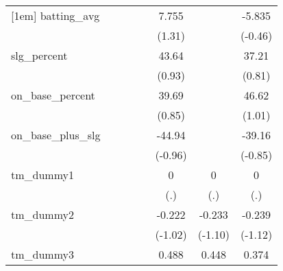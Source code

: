 {\begin{tabular}{l*{7}{c}}
[1em]
batting\_avg &                     &                     &                     &                     &       7.755         &                     &      -5.835         \\
            &                     &                     &                     &                     &      (1.31)         &                     &     (-0.46)         \\
[1em]
slg\_percent &                     &                     &                     &                     &       43.64         &                     &       37.21         \\
            &                     &                     &                     &                     &      (0.93)         &                     &      (0.81)         \\
[1em]
on\_base\_percent&                     &                     &                     &                     &       39.69         &                     &       46.62         \\
            &                     &                     &                     &                     &      (0.85)         &                     &      (1.01)         \\
[1em]
on\_base\_plus\_slg&                     &                     &                     &                     &      -44.94         &                     &      -39.16         \\
            &                     &                     &                     &                     &     (-0.96)         &                     &     (-0.85)         \\
[1em]
tm\_dummy1   &                     &                     &                     &                     &           0         &           0         &           0         \\
            &                     &                     &                     &                     &         (.)         &         (.)         &         (.)         \\
[1em]
tm\_dummy2   &                     &                     &                     &                     &      -0.222         &      -0.233         &      -0.239         \\
            &                     &                     &                     &                     &     (-1.02)         &     (-1.10)         &     (-1.12)         \\
[1em]
tm\_dummy3   &                     &                     &                     &                     &       0.488\sym{*}  &       0.448\sym{*}  &       0.374         \\

\end{tabular}}
